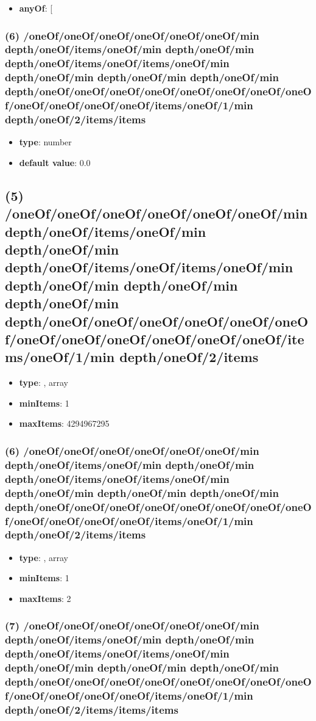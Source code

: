 \begin{itemize}[leftmargin=6em]\item {\bf anyOf}: [\end{itemize}\subsubsection{(6) /oneOf/oneOf/oneOf/oneOf/oneOf/oneOf/min depth/oneOf/items/oneOf/min depth/oneOf/min depth/oneOf/items/oneOf/items/oneOf/min depth/oneOf/min depth/oneOf/min depth/oneOf/min depth/oneOf/oneOf/oneOf/oneOf/oneOf/oneOf/oneOf/oneOf/oneOf/oneOf/oneOf/oneOf/items/oneOf/1/min depth/oneOf/2/items/items}
\begin{itemize}[leftmargin=6em]\item {\bf type}: number\item {\bf default value}: 0.0
\end{itemize}\subsection{(5) /oneOf/oneOf/oneOf/oneOf/oneOf/oneOf/min depth/oneOf/items/oneOf/min depth/oneOf/min depth/oneOf/items/oneOf/items/oneOf/min depth/oneOf/min depth/oneOf/min depth/oneOf/min depth/oneOf/oneOf/oneOf/oneOf/oneOf/oneOf/oneOf/oneOf/oneOf/oneOf/oneOf/oneOf/items/oneOf/1/min depth/oneOf/2/items}
\begin{itemize}[leftmargin=5em]\item {\bf type}: , array\item {\bf minItems}: 1
\item {\bf maxItems}: 4294967295
\end{itemize}\subsubsection{(6) /oneOf/oneOf/oneOf/oneOf/oneOf/oneOf/min depth/oneOf/items/oneOf/min depth/oneOf/min depth/oneOf/items/oneOf/items/oneOf/min depth/oneOf/min depth/oneOf/min depth/oneOf/min depth/oneOf/oneOf/oneOf/oneOf/oneOf/oneOf/oneOf/oneOf/oneOf/oneOf/oneOf/oneOf/items/oneOf/1/min depth/oneOf/2/items/items}
\begin{itemize}[leftmargin=6em]\item {\bf type}: , array\item {\bf minItems}: 1
\item {\bf maxItems}: 2
\end{itemize}\subsubsection{(7) /oneOf/oneOf/oneOf/oneOf/oneOf/oneOf/min depth/oneOf/items/oneOf/min depth/oneOf/min depth/oneOf/items/oneOf/items/oneOf/min depth/oneOf/min depth/oneOf/min depth/oneOf/min depth/oneOf/oneOf/oneOf/oneOf/oneOf/oneOf/oneOf/oneOf/oneOf/oneOf/oneOf/oneOf/items/oneOf/1/min depth/oneOf/2/items/items/items}

